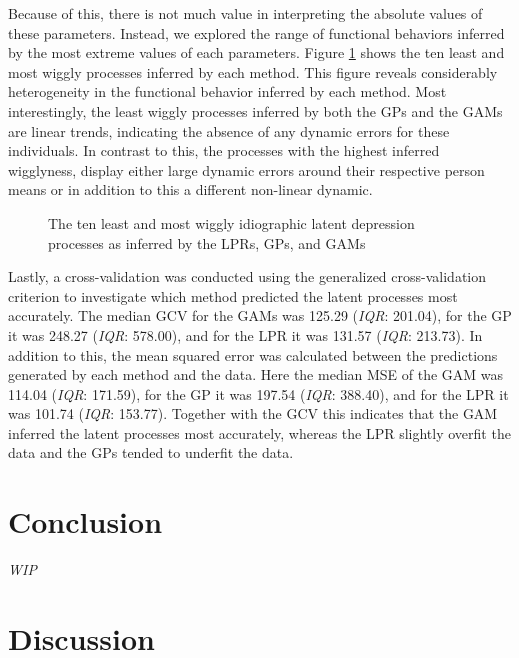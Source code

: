 \documentclass[man, floatsintext]{apa7}
\begin{document}
Because of this, there is not much value in interpreting the absolute values of
these parameters. Instead, we explored the range of functional behaviors
inferred by the most extreme values of each parameters. Figure
\ref{fig:dem_smooth} shows the ten least and most wiggly processes inferred by
each method. This figure reveals considerably heterogeneity in the functional
behavior inferred by each method. Most interestingly, the least wiggly
processes inferred by both the GPs and the GAMs are linear trends, indicating
the absence of any dynamic errors for these individuals. In contrast to this,
the processes with the highest inferred wigglyness, display either large
dynamic errors around their respective person means or in addition to this a
different non-linear dynamic.

\begin{figure}[!t]
  \caption{The ten least and most wiggly idiographic latent depression
    processes as inferred by the LPRs, GPs, and GAMs}
  \label{fig:dem_smooth}
\end{figure}

Lastly, a cross-validation was conducted using the generalized cross-validation
criterion to investigate which method predicted the latent processes most
accurately. The median GCV for the GAMs was 125.29 (\textit{IQR}: 201.04), for
the GP it was 248.27 (\textit{IQR}: 578.00), and for the LPR it was 131.57
(\textit{IQR}: 213.73). In addition to this, the mean squared error was
calculated between the predictions generated by each method and the data. Here
the median MSE of the GAM was 114.04 (\textit{IQR}: 171.59), for the GP it was
197.54 (\textit{IQR}: 388.40), and for the LPR it was 101.74 (\textit{IQR}:
153.77). Together with the GCV this indicates that the GAM inferred the latent
processes most accurately, whereas the LPR slightly overfit the data and the
GPs tended to underfit the data.

\section{Conclusion}

\textit{WIP}

\section{Discussion}

\end{document}
